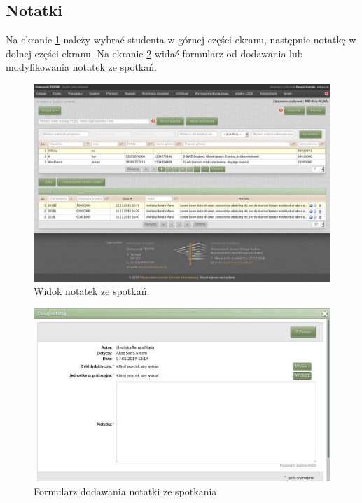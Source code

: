 \documentclass[licencjacka]{pracamgr}
\begin{document}
\subsection{Notatki}
Na ekranie \ref{fig:notatki} należy wybrać studenta w górnej części ekranu, następnie notatkę w dolnej części ekranu.
Na ekranie \ref{fig:formularz_notatek} widać formularz od dodawania lub modyfikowania notatek ze spotkań.

\begin{figure}[!]
  \includegraphics[width=\linewidth]{widok_notatek.jpg}
  \caption{Widok notatek ze spotkań.}
  \label{fig:notatki}
\end{figure}

\begin{figure}[!]
  \includegraphics[width=\linewidth]{formularz_notatek.jpg}
  \caption{Formularz dodawania notatki ze spotkania.}
  \label{fig:formularz_notatek}
\end{figure}


\FloatBarrier
\end{document}
